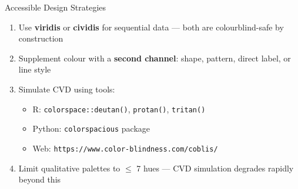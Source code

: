 \documentclass[10pt]{beamer}
\begin{document}
\begin{frame}{Accessible Design Strategies}
  \begin{enumerate}
    \item Use \textbf{viridis} or \textbf{cividis} for sequential data ---
          both are colourblind-safe by construction
    \item Supplement colour with a \textbf{second channel}: shape, pattern,
          direct label, or line style
    \item Simulate CVD using tools:
          \begin{itemize}
            \item R: \texttt{colorspace::deutan()}, \texttt{protan()}, \texttt{tritan()}
            \item Python: \texttt{colorspacious} package
            \item Web: \texttt{https://www.color-blindness.com/coblis/}
          \end{itemize}
    \item Limit qualitative palettes to $\leq$ 7 hues --- CVD simulation
          degrades rapidly beyond this
  \end{enumerate}
\end{frame}
\end{document}
